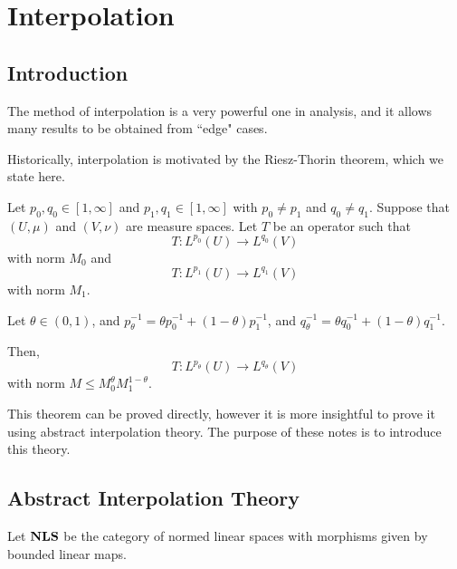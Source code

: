 
\chapter{Interpolation} %

\label{AppendixC} %




\section{Introduction}
The method of interpolation is a very powerful one in analysis,
and it allows many results to be obtained from ``edge" cases.

Historically, interpolation is motivated by the Riesz-Thorin theorem,
which we state here.
\begin{theorem}
    Let $p_0,q_0 \in [1,\infty]$ and $p_1,q_1 \in [1,\infty]$
    with $p_0 \neq p_1$ and $q_0 \neq q_1$. Suppose that $(U,\mu)$
    and $(V,\nu)$ are measure spaces. Let $T$ be an operator such that
    \begin{equation*}
        T:L^{p_0}(U)\rightarrow L^{q_0}(V)
    \end{equation*}
    with norm $M_0$ and
    \begin{equation*}
        T:L^{p_1}(U) \rightarrow L^{q_1}(V)
    \end{equation*}
    with norm $M_1$.
    
    Let $\theta \in (0,1)$, and $p_\theta^{-1} = \theta p_0^{-1}+(1-\theta)p_1^{-1}$,
    and $q_\theta^{-1} = \theta q_0^{-1}+(1-\theta)q_1^{-1}$. 
    
    Then,
    \begin{equation*}
        T:L^{p_\theta}(U)\rightarrow L^{q_\theta}(V)
    \end{equation*}
    with norm $M \leq M_0^{\theta} M_1^{1-\theta}$.
\end{theorem}
This theorem can be proved directly, however it is more insightful to prove it using
abstract interpolation theory. The purpose of these notes is to introduce this theory.


\section{Abstract Interpolation Theory}
Let $\mathrm{\mathbf{NLS}}$ be the category of normed linear spaces with morphisms
given by bounded linear maps.

